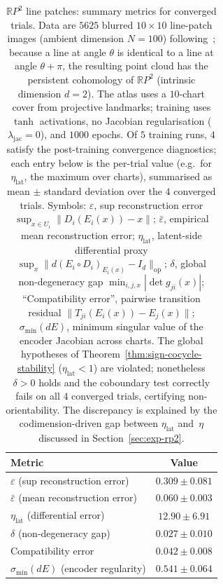 \documentclass[11pt]{article}
\theoremstyle{plain}
\theoremstyle{definition}
\theoremstyle{remark}
\begin{document}
\begin{table}[ht]
\centering
\caption{$\mathbb{R}P^2$ line patches: summary metrics for converged
trials. Data are $5625$ blurred $10\times 10$ line-patch images
(ambient dimension $N=100$) following~\cite{10.1007/s00454-017-9927-2};
because a line at angle $\theta$ is identical to a line at angle
$\theta+\pi$, the resulting point cloud has the persistent cohomology
of $\mathbb{R}P^2$ (intrinsic dimension $d=2$). The atlas uses a
$10$-chart cover from projective landmarks; training uses $\tanh$
activations, no Jacobian regularisation ($\lambda_{\mathrm{jac}}=0$),
and $1000$ epochs. Of $5$ training runs, $4$ satisfy the post-training
convergence diagnostics; each entry below is the per-trial value
(e.g.\ for $\eta_{\mathrm{lat}}$, the maximum over charts), summarised
as mean $\pm$ standard deviation over the $4$ converged trials.
Symbols: $\varepsilon$, sup reconstruction error
$\sup_{x\in U_i}\|D_i(E_i(x))-x\|$; $\bar\varepsilon$, empirical mean
reconstruction error; $\eta_{\mathrm{lat}}$, latent-side differential
proxy $\sup_x\|d(E_i\circ D_i)_{E_i(x)}-I_d\|_{\mathrm{op}}$;
$\delta$, global non-degeneracy gap $\min_{i,j,x}|\det g_{ji}(x)|$;
``Compatibility error'', pairwise transition residual
$\|T_{ji}(E_i(x))-E_j(x)\|$; $\sigma_{\min}(dE)$, minimum singular value
of the encoder Jacobian across charts. The global hypotheses of
Theorem~\ref{thm:sign-cocycle-stability} ($\eta_{\mathrm{lat}}<1$) are
violated; nonetheless $\delta>0$ holds and the coboundary test
correctly fails on all $4$ converged trials, certifying
non-orientability. The discrepancy is explained by the
codimension-driven gap between $\eta_{\mathrm{lat}}$ and~$\eta$
discussed in Section~\ref{sec:exp-rp2}.}
\label{tab:rp2_converged}
\begin{tabular}{lc}
\toprule
Metric & Value \\
\midrule
$\varepsilon$ (sup reconstruction error)        & $0.309 \pm 0.081$ \\
$\bar\varepsilon$ (mean reconstruction error)   & $0.060 \pm 0.003$ \\
$\eta_{\mathrm{lat}}$ (differential error)      & $12.90 \pm 6.91$  \\
$\delta$ (non-degeneracy gap)                   & $0.027 \pm 0.010$ \\
Compatibility error                             & $0.042 \pm 0.008$ \\
$\sigma_{\min}(dE)$ (encoder regularity)        & $0.541 \pm 0.064$ \\
\bottomrule
\end{tabular}
\end{table}
\end{document}

